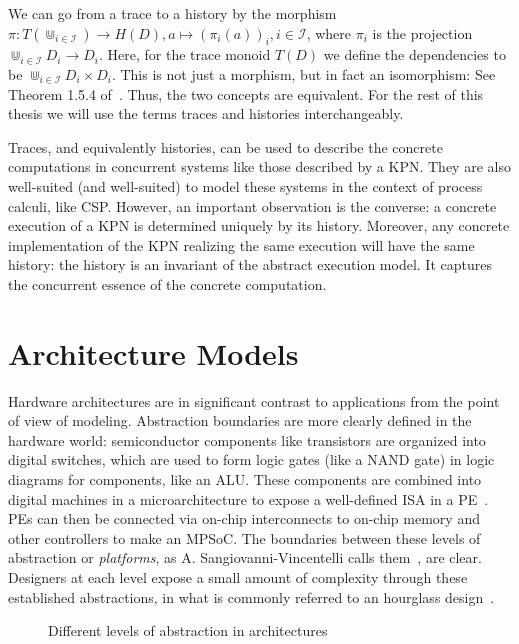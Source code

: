 We can go from a trace to a history by the morphism $\pi: T(\Cup_{i \in \mathcal{I}}) \rightarrow H(D), a \mapsto (\pi_i(a))_i, i \in \mathcal{I}$, where $\pi_i$ is the projection $\Cup_{i \in \mathcal{I}}D_i \rightarrow D_i$.
Here, for the trace monoid $T(D)$ we define the dependencies to be $\Cup_{i \in \mathcal{I}}D_i \times D_i$. 
This is not just a morphism, but in fact an isomorphism: See Theorem 1.5.4 of~\cite{mazurkiewicz1995introduction}.
Thus, the two concepts are equivalent.
For the rest of this thesis we will use the terms traces and histories interchangeably.


Traces, and equivalently histories, can be used to describe the concrete computations in concurrent systems like those described by a \ac{KPN}.
They are also well-suited (and well-suited) to model these systems in the context of process calculi, like \ac{CSP}.
However, an important observation is the converse: a concrete execution of a \ac{KPN} is determined uniquely by its history.
Moreover, any concrete implementation of the \ac{KPN} realizing the same execution will have the same history: the history is an invariant of the abstract execution model.
It captures the concurrent essence of the concrete computation.

\section{Architecture Models}
\label{sec:arch_models}
Hardware architectures are in significant contrast to applications from the point of view of modeling.
Abstraction boundaries are more clearly defined in the hardware world: semiconductor components like transistors are organized into digital switches, which are used to form logic gates (like a NAND gate) in logic diagrams for components, like an \ac{ALU}.
These components are combined into digital machines in a microarchitecture to expose a well-defined \acf{ISA} in a \ac{PE}~\cite{lee2017plato}.
\acp{PE} can then be connected via on-chip interconnects to on-chip memory and other controllers to make an \ac{MPSoC}.
The boundaries between these levels of abstraction or \emph{platforms}, as A. Sangiovanni-Vincentelli calls them~\cite{sangiovanni2007quo}, are clear.
Designers at each level expose a small amount of complexity through these established abstractions, in what is commonly referred to an hourglass design~\cite{10.1145/3274770}.

\begin{figure}[h]
	\centering
\resizebox{0.8\textwidth}{!}{
   \begin{tikzpicture}
     
   \end{tikzpicture}
 }
   \caption{Different levels of abstraction in architectures}
   \label{fig:architecture_abstractions}
\end{figure}

